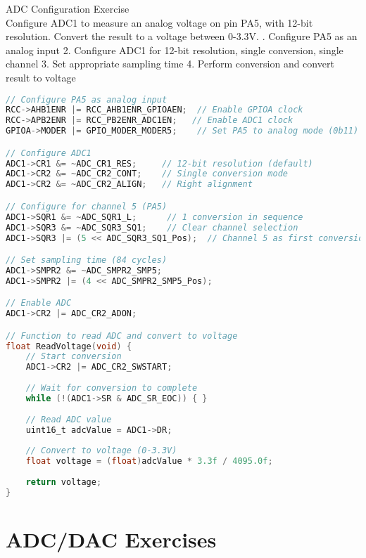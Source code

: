 \begin{example2}{ADC Configuration Exercise}\\
Configure ADC1 to measure an analog voltage on pin PA5, with 12-bit resolution. Convert the result to a voltage between 0-3.3V.
. Configure PA5 as an analog input
2. Configure ADC1 for 12-bit resolution, single conversion, single channel
3. Set appropriate sampling time
4. Perform conversion and convert result to voltage

\begin{lstlisting}[language=C, style=basesmol]
// Configure PA5 as analog input
RCC->AHB1ENR |= RCC_AHB1ENR_GPIOAEN;  // Enable GPIOA clock
RCC->APB2ENR |= RCC_PB2ENR_ADC1EN;   // Enable ADC1 clock
GPIOA->MODER |= GPIO_MODER_MODER5;    // Set PA5 to analog mode (0b11)

// Configure ADC1
ADC1->CR1 &= ~ADC_CR1_RES;     // 12-bit resolution (default)
ADC1->CR2 &= ~ADC_CR2_CONT;    // Single conversion mode
ADC1->CR2 &= ~ADC_CR2_ALIGN;   // Right alignment

// Configure for channel 5 (PA5)
ADC1->SQR1 &= ~ADC_SQR1_L;      // 1 conversion in sequence
ADC1->SQR3 &= ~ADC_SQR3_SQ1;    // Clear channel selection
ADC1->SQR3 |= (5 << ADC_SQR3_SQ1_Pos);  // Channel 5 as first conversion

// Set sampling time (84 cycles)
ADC1->SMPR2 &= ~ADC_SMPR2_SMP5;
ADC1->SMPR2 |= (4 << ADC_SMPR2_SMP5_Pos);

// Enable ADC
ADC1->CR2 |= ADC_CR2_ADON;

// Function to read ADC and convert to voltage
float ReadVoltage(void) {
    // Start conversion
    ADC1->CR2 |= ADC_CR2_SWSTART;
    
    // Wait for conversion to complete
    while (!(ADC1->SR & ADC_SR_EOC)) { }
    
    // Read ADC value
    uint16_t adcValue = ADC1->DR;
    
    // Convert to voltage (0-3.3V)
    float voltage = (float)adcValue * 3.3f / 4095.0f;
    
    return voltage;
}
\end{lstlisting}
\end{example2}

\section{ADC/DAC Exercises}


